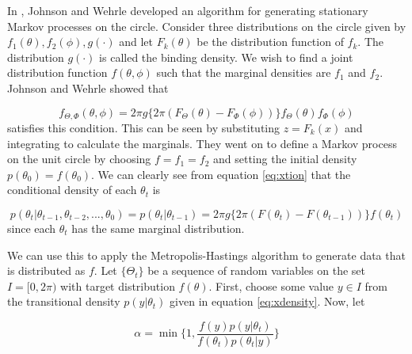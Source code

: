 \documentclass[12pt]{article}
\numberwithin{equation}{section}
\numberwithin{figure}{section}
\begin{document}
In \cite{Johnson} , Johnson and Wehrle developed an algorithm for generating stationary Markov processes on the circle. Consider three distributions on the circle given by $f_1(\theta),f_2(\phi), g(\cdot)$ and let $F_k(\theta)$ be the distribution function of $f_k$. The distribution $g(\cdot)$ is called the binding density. We wish to find a joint distribution function $f(\theta, \phi)$ such that the marginal densities are $f_1$ and $f_2$. Johnson and Wehrle showed that 

\begin{equation}\label{eq:xtion}
 f_{\Theta, \Phi}(\theta, \phi) = 2\pi g\{ 2\pi(F_{\Theta}(\theta)  -  F_\Phi(\phi)) \}f_\Theta(\theta)f_\Phi(\phi)
\end{equation}
satisfies this condition. This can be seen by substituting $z = F_k( x )$ and integrating to calculate the marginals. They went on to define a Markov process on the unit circle by choosing $f=f_1=f_2$ and setting the initial density $p(\theta_0) = f(\theta_0)$. We can clearly see from equation \ref{eq:xtion} that the conditional density of each $\theta_t$ is 

\begin{equation} \label{eq:xdensity}
p(\theta_t | \theta_{t-1}, \theta_{t-2}, ..., \theta_0) = p(\theta_t | \theta_{t-1} )=  2\pi g\{2\pi( F(\theta_t)  -  F(\theta_{t-1})) \}f(\theta_t)
\end{equation}
since each $\theta_t$ has the same marginal distribution.

We can use this to apply the Metropolis-Hastings algorithm \cite{Metropolis} to generate data that is distributed as $f$. Let $\{\Theta_t\}$ be a sequence of random variables on the set $I = [0,2\pi)$ with target distribution $f(\theta)$. First, choose some value $y \in I$ from the transitional density $p(y|\theta_t)$ given in equation \ref{eq:xdensity}. Now, let

\begin{equation}\label{eq:alpha}
\alpha = \min\{1,\frac{f(y)p(y|\theta_t)}{f(\theta_t)p(\theta_t|y)}\}
\end{equation}
\end{document}

